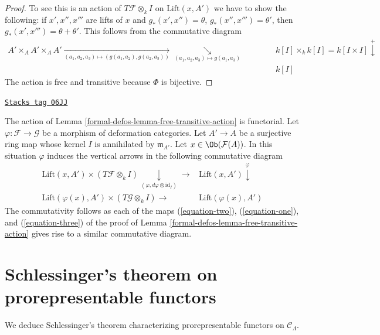 \begin{proof}
To see this is an action of $T\mathcal{F} \otimes_k I$ on $\text{Lift}(x, A')$
we have to show the following: if $x', x'', x'''$ are lifts of $x$ and
$g_*(x', x'') = \theta$, $g_*(x'', x''') = \theta'$, then
$g_*(x', x''') = \theta + \theta'$. This follows from the commutative
diagram
$$
\begin{array}{cccccc}A' \times_A A' \times_A A'
\underset{(a_1, a_2, a_3) \mapsto (g(a_1, a_2), g(a_2, a_3))}{\longrightarrow}\underset{(a_1, a_2, a_3) \mapsto g(a_1, a_3)}{\searrow} &  &  &  &  & k[I] \times_k k[I] = k[I \times I] \overset{+}{\downarrow} \\  &  &  &  &  & k[I]\end{array}
$$
The action is free and transitive because $\Phi$ is bijective.
\end{proof}

\begin{remark}
\label{formal-defos-remark-free-transitive-action-functorial}
\href{https://stacks.math.columbia.edu/tag/06JJ}{\texttt{Stacks tag 06JJ}}

The action of Lemma \ref{formal-defos-lemma-free-transitive-action} is functorial.
Let $\varphi : \mathcal{F} \to \mathcal{G}$ be a morphism of deformation
categories. Let $A' \to A$ be a surjective ring map whose kernel $I$
is annihilated by $\mathfrak m_{A'}$. Let
$x \in \Ob(\mathcal{F}(A))$.
In this situation $\varphi$ induces the vertical arrows
in the following commutative diagram
$$
\begin{array}{cc}\text{Lift}(x, A') \times (T\mathcal{F} \otimes_k I)
\underset{(\varphi, d\varphi \otimes \text{id}_I)}{\downarrow}\longrightarrow & \text{Lift}(x, A') \overset{\varphi}{\downarrow} \\ \text{Lift}(\varphi(x), A') \times (T\mathcal{G} \otimes_k I) \longrightarrow & \text{Lift}(\varphi(x), A')\end{array}
$$
The commutativity follows as each of the maps
(\ref{equation-two}), (\ref{equation-one}), and (\ref{equation-three})
of the proof of
Lemma \ref{formal-defos-lemma-free-transitive-action}
gives rise to a similar commutative diagram.
\end{remark}

\section{Schlessinger's theorem on prorepresentable functors}
\label{formal-defos-section-schlessingers-theorem}
We deduce Schlessinger's theorem characterizing prorepresentable functors on
$\mathcal{C}_\Lambda$.

